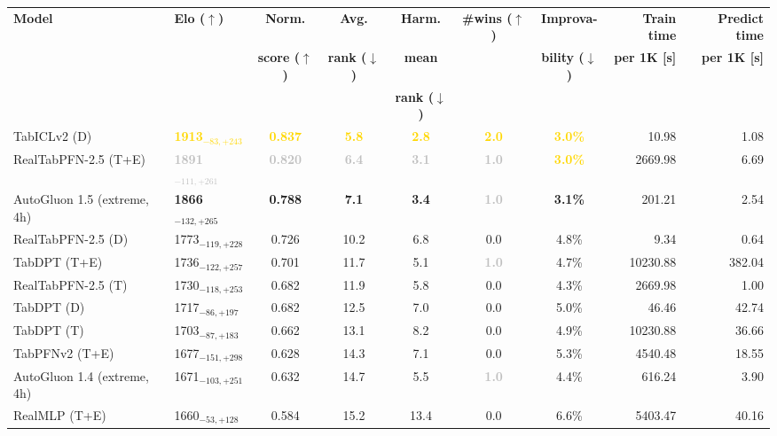 \begin{tabular}{llcccccrr}
\toprule
\textbf{Model} & \textbf{Elo ($\uparrow$)} & \textbf{Norm.} & \textbf{Avg.} & \textbf{Harm.} & \textbf{\#wins ($\uparrow$)} & \textbf{Improva-} & \textbf{Train time} & \textbf{Predict time} \\
 &  & \textbf{score ($\uparrow$)} & \textbf{rank ($\downarrow$)} & \textbf{mean} &  & \textbf{bility ($\downarrow$)} & \textbf{per 1K [s]} & \textbf{per 1K [s]} \\
 &  &  &  & \textbf{rank ($\downarrow$)} &  &  &  &  \\
\midrule
TabICLv2 (D) & \textcolor{gold}{\textbf{1913${}_{-83,+243}$}} & \textcolor{gold}{\textbf{0.837}} & \textcolor{gold}{\textbf{5.8}} & \textcolor{gold}{\textbf{2.8}} & \textcolor{gold}{\textbf{2.0}} & \textcolor{gold}{\textbf{3.0\%}} & 10.98 & 1.08 \\
RealTabPFN-2.5 (T+E) & \textcolor{silver}{\textbf{1891${}_{-111,+261}$}} & \textcolor{silver}{\textbf{0.820}} & \textcolor{silver}{\textbf{6.4}} & \textcolor{silver}{\textbf{3.1}} & \textcolor{silver}{\textbf{1.0}} & \textcolor{gold}{\textbf{3.0\%}} & 2669.98 & 6.69 \\
AutoGluon 1.5 (extreme, 4h) & \textcolor{bronze}{\textbf{1866${}_{-132,+265}$}} & \textcolor{bronze}{\textbf{0.788}} & \textcolor{bronze}{\textbf{7.1}} & \textcolor{bronze}{\textbf{3.4}} & \textcolor{silver}{\textbf{1.0}} & \textcolor{bronze}{\textbf{3.1\%}} & 201.21 & 2.54 \\
RealTabPFN-2.5 (D) & 1773${}_{-119,+228}$ & 0.726 & 10.2 & 6.8 & 0.0 & 4.8\% & 9.34 & 0.64 \\
TabDPT (T+E) & 1736${}_{-122,+257}$ & 0.701 & 11.7 & 5.1 & \textcolor{silver}{\textbf{1.0}} & 4.7\% & 10230.88 & 382.04 \\
RealTabPFN-2.5 (T) & 1730${}_{-118,+253}$ & 0.682 & 11.9 & 5.8 & 0.0 & 4.3\% & 2669.98 & 1.00 \\
TabDPT (D) & 1717${}_{-86,+197}$ & 0.682 & 12.5 & 7.0 & 0.0 & 5.0\% & 46.46 & 42.74 \\
TabDPT (T) & 1703${}_{-87,+183}$ & 0.662 & 13.1 & 8.2 & 0.0 & 4.9\% & 10230.88 & 36.66 \\
TabPFNv2 (T+E) & 1677${}_{-151,+298}$ & 0.628 & 14.3 & 7.1 & 0.0 & 5.3\% & 4540.48 & 18.55 \\
AutoGluon 1.4 (extreme, 4h) & 1671${}_{-103,+251}$ & 0.632 & 14.7 & 5.5 & \textcolor{silver}{\textbf{1.0}} & 4.4\% & 616.24 & 3.90 \\
RealMLP (T+E) & 1660${}_{-53,+128}$ & 0.584 & 15.2 & 13.4 & 0.0 & 6.6\% & 5403.47 & 40.16 \\

\end{tabular}
